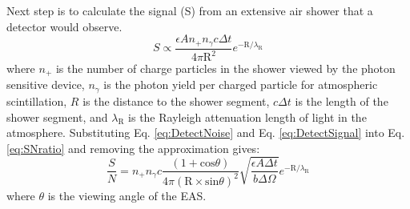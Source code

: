 Next step is to calculate the signal (S) from an extensive air shower that a detector would observe.
\begin{equation}
S \propto \frac{\epsilon A n_{+} n_{\gamma} c \Delta t}{4 \pi \mathrm{R}^2} e^{-\mathrm{R}/\lambda_{\mathrm{R}}} \label{eq:DetectSignal}
\end{equation}
where $n_+$ is the number of charge particles in the shower viewed by the photon sensitive device, $n_{\gamma}$ is the photon yield per charged particle for atmospheric scintillation, $R$ is the distance to the shower segment, $c\Delta t$ is the length of the shower segment, and $\lambda_{\mathrm{R}}$ is the Rayleigh attenuation length of light in the atmosphere. Substituting Eq. \ref{eq:DetectNoise} and Eq. \ref{eq:DetectSignal} into Eq. \ref{eq:SNratio} and removing the approximation gives:
\begin{equation}
\frac{S}{N} = n_+ n_{\gamma} c \frac{(1 + \mathrm{cos}\theta)}{4 \pi (\mathrm{R} \times \mathrm{sin}\theta)^2} \sqrt{\frac{\epsilon A \Delta t}{b \Delta\Omega}} e^{-\mathrm{R}/\lambda_{\mathrm{R}}} \label{eq:SN_complete}
\end{equation}
where $\theta$ is the viewing angle of the EAS.

